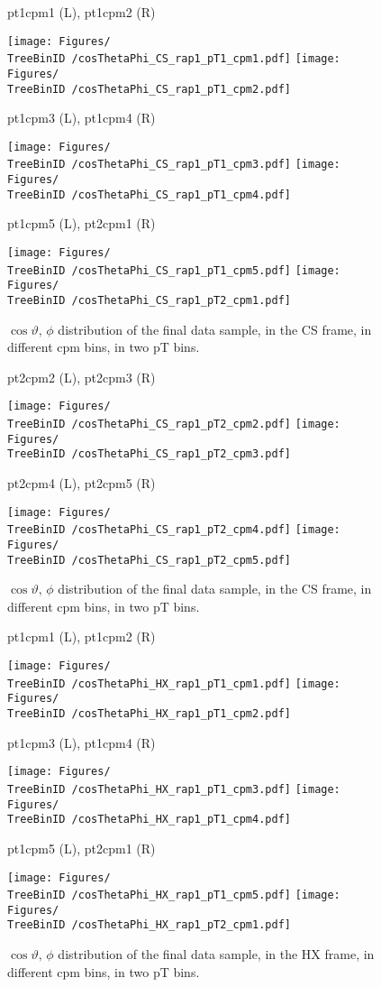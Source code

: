 \documentclass[12pt]{article}
\providecommand{\TreeBinID}[1]{TreeBinIDDefault_rap1pt1}%
\begin{document}

\begin{figure}[htbp]
\centering
\caption{pt1cpm1 (L), pt1cpm2 (R)}
\texttt{[image: Figures/\\TreeBinID /cosThetaPhi\_CS\_rap1\_pT1\_cpm1.pdf]}
\texttt{[image: Figures/\\TreeBinID /cosThetaPhi\_CS\_rap1\_pT1\_cpm2.pdf]}
\caption{pt1cpm3 (L), pt1cpm4 (R)}
\texttt{[image: Figures/\\TreeBinID /cosThetaPhi\_CS\_rap1\_pT1\_cpm3.pdf]}
\texttt{[image: Figures/\\TreeBinID /cosThetaPhi\_CS\_rap1\_pT1\_cpm4.pdf]}
\caption{pt1cpm5 (L), pt2cpm1 (R)}
\texttt{[image: Figures/\\TreeBinID /cosThetaPhi\_CS\_rap1\_pT1\_cpm5.pdf]}
\texttt{[image: Figures/\\TreeBinID /cosThetaPhi\_CS\_rap1\_pT2\_cpm1.pdf]}
\caption{$\cos\vartheta,\,\phi$ distribution of the final data sample, in the CS
frame, in different cpm bins, in two pT bins.}
\end{figure}
\clearpage

\begin{figure}[htbp]
\centering
\caption{pt2cpm2 (L), pt2cpm3 (R)}
\texttt{[image: Figures/\\TreeBinID /cosThetaPhi\_CS\_rap1\_pT2\_cpm2.pdf]}
\texttt{[image: Figures/\\TreeBinID /cosThetaPhi\_CS\_rap1\_pT2\_cpm3.pdf]}
\caption{pt2cpm4 (L), pt2cpm5 (R)}
\texttt{[image: Figures/\\TreeBinID /cosThetaPhi\_CS\_rap1\_pT2\_cpm4.pdf]}
\texttt{[image: Figures/\\TreeBinID /cosThetaPhi\_CS\_rap1\_pT2\_cpm5.pdf]}
\caption{$\cos\vartheta,\,\phi$ distribution of the final data sample, in the CS
frame, in different cpm bins, in two pT bins.}
\end{figure}
\clearpage




\begin{figure}[htbp]
\centering
\caption{pt1cpm1 (L), pt1cpm2 (R)}
\texttt{[image: Figures/\\TreeBinID /cosThetaPhi\_HX\_rap1\_pT1\_cpm1.pdf]}
\texttt{[image: Figures/\\TreeBinID /cosThetaPhi\_HX\_rap1\_pT1\_cpm2.pdf]}
\caption{pt1cpm3 (L), pt1cpm4 (R)}
\texttt{[image: Figures/\\TreeBinID /cosThetaPhi\_HX\_rap1\_pT1\_cpm3.pdf]}
\texttt{[image: Figures/\\TreeBinID /cosThetaPhi\_HX\_rap1\_pT1\_cpm4.pdf]}
\caption{pt1cpm5 (L), pt2cpm1 (R)}
\texttt{[image: Figures/\\TreeBinID /cosThetaPhi\_HX\_rap1\_pT1\_cpm5.pdf]}
\texttt{[image: Figures/\\TreeBinID /cosThetaPhi\_HX\_rap1\_pT2\_cpm1.pdf]}
\caption{$\cos\vartheta,\,\phi$ distribution of the final data sample, in the HX
frame, in different cpm bins, in two pT bins.}
\end{figure}
\clearpage
\end{document}
